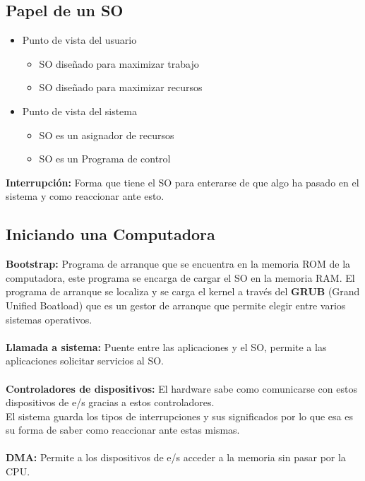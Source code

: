 \documentclass{templateNote}
\begin{document}
\subsection*{Papel de un SO}
\begin{itemize}
    \item Punto de vista del usuario
    \begin{itemize}
        \item SO diseñado para maximizar trabajo
        \item SO diseñado para maximizar recursos
    \end{itemize}
    \item Punto de vista del sistema
    \begin{itemize}
        \item SO es un asignador de recursos
        \item SO es un Programa de control
    \end{itemize}
\end{itemize}

\noindent\textbf{Interrupción:} Forma que tiene el SO para enterarse de que algo ha pasado en el sistema y como reaccionar ante esto.

\subsection*{Iniciando una Computadora}
\noindent\textbf{Bootstrap:} Programa de arranque que se encuentra en la memoria ROM de la computadora, este programa se encarga de cargar el SO en la memoria RAM.
El programa de arranque se localiza y se carga el kernel a través del \textbf{GRUB} (Grand Unified Boatload) que es un gestor de arranque que permite elegir entre varios sistemas operativos.
\\\\
\noindent\textbf{Llamada a sistema:} Puente entre las aplicaciones y el SO, permite a las aplicaciones solicitar servicios al SO.
\\\\
\noindent\textbf{Controladores de dispositivos:} El hardware sabe como comunicarse con estos dispositivos de e/s gracias a estos controladores.
\\El sistema guarda los tipos de interrupciones y sus significados por lo que esa es su forma de saber como reaccionar ante estas mismas.
\\\\
\noindent\textbf{DMA:} Permite a los dispositivos de e/s acceder a la memoria sin pasar por la CPU.
\end{document}
